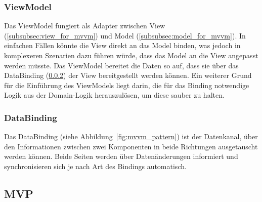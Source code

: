 \subsubsection{ViewModel}
\label{subsubsec:viewmodel}
Das ViewModel fungiert als Adapter zwischen View (\ref{subsubsec:view_for_mvvm}) und Model (\ref{subsubsec:model_for_mvvm}). 
In einfachen Fällen könnte die View direkt an das Model binden, was jedoch in komplexeren Szenarien dazu führen würde, dass das Model an die View angepasst werden müsste. Das ViewModel bereitet die Daten so auf, dass sie über das DataBinding (\ref{subsubsec:databinding}) der View bereitgestellt werden können. 
Ein weiterer Grund für die Einführung des ViewModels liegt darin, die für das Binding notwendige Logik aus der Domain-Logik herauszulösen, um diese sauber zu halten.

\newpage

\subsubsection{DataBinding}
\label{subsubsec:databinding}
Das DataBinding (siehe Abbildung~\ref{fig:mvvm_pattern}) ist der Datenkanal, über den Informationen zwischen zwei Komponenten in beide Richtungen ausgetauscht werden können. 
Beide Seiten werden über Datenänderungen informiert und synchronisieren sich je nach Art des Bindings automatisch.

\subsection{MVP}
\label{subsec:mvp}






